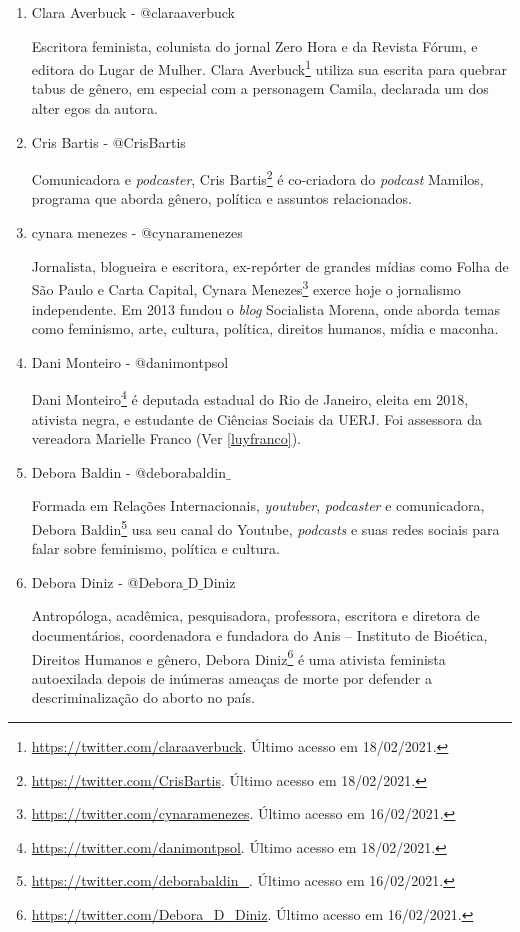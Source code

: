 \documentclass[
	12pt,				%
	openright,			%
	twoside,			%
	a4paper,			%
	english,			%
	brazil				%
	]{abntex2}
\begin{document}
\begin{anexosenv}
\begin{enumerate}
 \item Clara Averbuck - @claraaverbuck
 
 Escritora feminista, colunista do jornal Zero Hora e da Revista Fórum, e editora do Lugar de Mulher. Clara Averbuck\footnote{\url{https://twitter.com/claraaverbuck}. Último acesso em 18/02/2021.} utiliza sua escrita para quebrar tabus de gênero, em especial com a personagem Camila, declarada um dos alter egos da autora.

 \item Cris Bartis - @CrisBartis\label{crisbartis}
 
 Comunicadora e \textit{podcaster}, Cris Bartis\footnote{\url{https://twitter.com/CrisBartis}. Último acesso em 18/02/2021.} é co-criadora do \textit{podcast} Mamilos, programa que aborda gênero, política e assuntos relacionados.

 \item cynara menezes - @cynaramenezes
 
 Jornalista, blogueira e escritora, ex-repórter de grandes mídias como Folha de São Paulo e Carta Capital, Cynara Menezes\footnote{\url{https://twitter.com/cynaramenezes}. Último acesso em 16/02/2021.} exerce hoje o jornalismo independente. Em 2013 fundou o \textit{blog} Socialista Morena, onde aborda temas como feminismo, arte, cultura, política, direitos humanos, mídia e maconha.

 \item Dani Monteiro - @danimontpsol\label{danimonteiro}
 
 Dani Monteiro\footnote{\url{https://twitter.com/danimontpsol}. Último acesso em 18/02/2021.} é deputada estadual do Rio de Janeiro, eleita em 2018, ativista negra, e estudante de Ciências Sociais da UERJ. Foi assessora da vereadora Marielle Franco (Ver \ref{luyfranco}).

 \item Debora Baldin - @deborabaldin$\_$
 
 Formada em Relações Internacionais, \textit{youtuber}, \textit{podcaster} e comunicadora, Debora Baldin\footnote{\url{https://twitter.com/deborabaldin_}. Último acesso em 16/02/2021.} usa seu canal do Youtube, \textit{podcasts} e suas redes sociais para falar sobre feminismo, política e cultura.

 \item Debora Diniz - @Debora$\_$D$\_$Diniz
 
 Antropóloga, acadêmica, pesquisadora, professora, escritora e diretora de documentários, coordenadora e fundadora do Anis -- Instituto de Bioética, Direitos Humanos e gênero, Debora Diniz\footnote{\url{https://twitter.com/Debora_D_Diniz}. Último acesso em 16/02/2021.} é uma ativista feminista autoexilada depois de inúmeras ameaças de morte por defender a descriminalização do aborto no país.


\end{enumerate}
\end{anexosenv}
\end{document}
